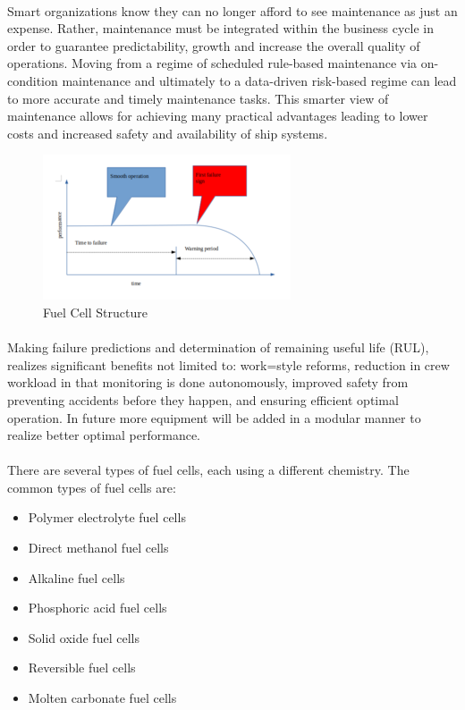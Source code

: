 \paragraph{}Smart organizations know they can no longer afford to see maintenance as just an expense. Rather, maintenance must be integrated within the business cycle in order to guarantee predictability, growth and increase the overall quality of operations. Moving from a regime of scheduled rule-based maintenance via on-condition maintenance and ultimately to a data-driven risk-based regime can lead to more accurate and timely maintenance tasks. This smarter view of maintenance allows for achieving many practical advantages leading to lower costs and increased safety and availability of ship
systems.\cite{knutsen_beyond_2014}
\begin{figure}
\includegraphics{Figures/figure_1}
\caption{Fuel Cell Structure
\cite{pukrushpan_modeling_2003}}
\end{figure}

\paragraph{}Making  failure predictions and determination of remaining useful life (RUL), realizes significant benefits not limited to: work=style reforms, reduction in crew workload in that monitoring is done autonomously, improved safety from preventing accidents before they happen, and ensuring efficient optimal operation.
\cite{gaeid_diagnosis_2010}
In future more equipment will be added in a modular manner to realize better optimal performance.

\paragraph{}There are several types of fuel cells, each using a different chemistry. The common types of fuel cells are:
\begin{itemize}
\item Polymer electrolyte fuel cells
\item Direct methanol fuel cells
\item Alkaline fuel cells
\item Phosphoric acid fuel cells
\item Solid oxide fuel cells
\item Reversible fuel cells
\item Molten carbonate fuel cells
\end{itemize}
